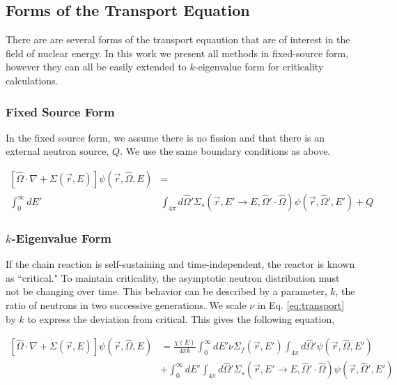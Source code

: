 \subsection{Forms of the Transport Equation}
There are are several forms of the transport equaution that are of interest in the field of nuclear energy. In this work we present all methods in fixed-source form, however they can all be easily extended to $k$-eigenvalue form for criticality calculations. 

\subsubsection{Fixed Source Form}
In the fixed source form, we assume there is no fission and that there is an external neutron source, $Q$. We use the same boundary conditions as above. 

\begin{equation}
\begin{split}
 [\hat{\Omega} \cdot \nabla + \Sigma(\vec{r}, E)]\psi(\vec{r}, \hat{\Omega}, E) &= \\ \int_0^\infty dE' &\int_{4\pi} d\hat{\Omega}' \Sigma_s(\vec{r}, E' \rightarrow E, \hat{\Omega}' \cdot \hat{\Omega})\psi(\vec{r}, \hat{\Omega}', E')  + Q 
\end{split}
 \label{eq:transport_fixed_source}
\end{equation}

\subsubsection{$k$-Eigenvalue Form}
If the chain reaction is self-sustaining and time-independent, the reactor is known as ``critical." To maintain criticality, the asymptotic neutron distribution must not be changing over time. This behavior can be described by a parameter,  $k$, the ratio of neutrons in two successive generations. We scale $\nu$ in Eq. \eqref{eq:transport} by $k$ to express the deviation from critical. This gives the following equation,

\begin{equation}
    \label{eq:transport_eigenvalue}
    \begin{split}
        [\hat{\Omega} \cdot \nabla + \Sigma(\vec{r}, E)]\psi(\vec{r}, \hat{\Omega}, E) &= \frac{\chi(E)}{4\pi k} \int_0^\infty dE' \nu \Sigma_{f}(\vec{r}, E') \int_{4\pi} d\hat{\Omega}'\psi(\vec{r}, \hat{\Omega}, E') \\ &+ \int_0^\infty dE' \int_{4\pi} d\hat{\Omega}' \Sigma_s(\vec{r}, E' \rightarrow E, \hat{\Omega}' \cdot \hat{\Omega})\psi(\vec{r}, \hat{\Omega}', E') 
    \end{split}
\end{equation}

